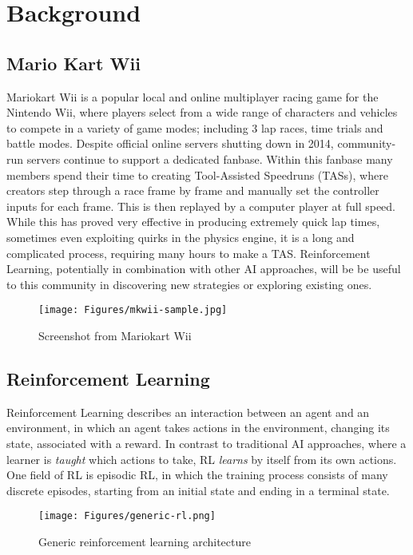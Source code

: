 
\chapter{Background}
\section{Mario Kart Wii}
Mariokart Wii is a popular local and online multiplayer racing game for the Nintendo Wii, where players select from a wide range of characters and vehicles to compete in a variety of game modes; including 3 lap races, time trials and battle modes. Despite official online servers shutting down in 2014, community-run servers continue to support a dedicated fanbase. Within this fanbase many members spend their time to creating Tool-Assisted Speedruns (TASs), where creators step through a race frame by frame and manually set the controller inputs for each frame. This is then replayed by a computer player at full speed. While this has proved very effective in producing extremely quick lap times, sometimes even exploiting quirks in the physics engine, it is a long and complicated process, requiring many hours to make a TAS. Reinforcement Learning, potentially in combination with other AI approaches, will be be useful to this community in discovering new strategies or exploring existing ones.
\begin{figure}
    \centering   \texttt{[image: Figures/mkwii-sample.jpg]}
    \caption{Screenshot from Mariokart Wii\cite{mkwii_sample_screenshot}}
    \label{fig:mariokart-standard}
\end{figure}
\section{Reinforcement Learning}
Reinforcement Learning describes an interaction between an agent and an environment, in which an agent takes actions in the environment, changing its state, associated with a reward\cite{sutton2018reinforcement}. In contrast to traditional AI approaches, where a learner is \textit{taught} which actions to take, RL \textit{learns} by itself from its own actions. One field of RL is episodic RL, in which the training process consists of many discrete episodes, starting from an initial state and ending in a terminal state. 
\begin{figure}[htb]
    \centering
    \texttt{[image: Figures/generic-rl.png]}
    \caption{Generic reinforcement learning architecture\cite{sutton2018reinforcement}} %
    \label{fig:q-learning-generic}
\end{figure}
